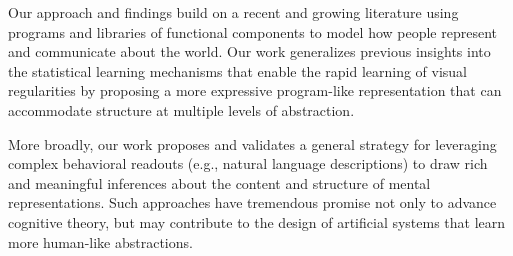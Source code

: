 \documentclass[10pt,letterpaper]{article}
\begin{document}

Our approach and findings build on a recent and growing literature using programs  and libraries of functional components  to model how people represent and communicate about the world. 
Our work generalizes previous insights into the statistical learning mechanisms that enable the rapid learning of visual regularities  by proposing a more expressive program-like representation that can accommodate structure at multiple levels of abstraction.

More broadly, our work proposes and validates a general strategy for leveraging complex behavioral readouts (e.g., natural language descriptions) to draw rich and meaningful inferences about the content and structure of mental representations.
Such approaches have tremendous promise not only to advance cognitive theory, but may contribute to the design of artificial systems that learn more human-like abstractions. 


\newpage


\end{document}
